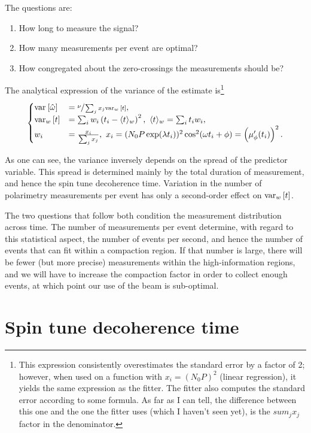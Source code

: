 \documentclass{article}
\begin{document}
The questions are:
\begin{enumerate}
	\item How long to measure the signal?
	\item How many measurements per event are optimal?
	\item How congregated about the zero-crossings the measurements should be?
\end{enumerate}

The analytical expression of the variance of the estimate is\footnote{This expression consistently overestimates the standard error by a factor of 2; however, when used on a function with $x_i = (N_0P)^2$ (linear regression), it yields the same expression as the fitter. The fitter also computes the standard error according to some formula. As far as I can tell, the difference between this one and the one the fitter uses (which I haven't seen yet), is the $sum_j x_j$ factor in the denominator.}
\begin{equation}
\begin{cases}
	\var{\hat\omega} &= \sfrac{\nu}{\sum_j x_j\var[w]{t}}, \\
	\var[w]{t} &= \sum_i w_i \bkt{t_i - \avg{t}_w}^2,~ \avg{t}_w = \sum_i t_i w_i, \\
	w_i &= \frac{x_i}{\sum_j x_j},~ x_i = (N_0P\exp(\lambda t_i))^2\cos^2(\omega t_i + \phi) = \bkt{\mupp}^2.
\end{cases}	
\end{equation}

As one can see, the variance inversely depends on the spread of the predictor variable. This spread is determined mainly by the total duration of measurement, and hence the spin tune decoherence time. Variation in the number of polarimetry measurements per event has only a second-order effect on $\var[w]{t}$.

The two questions that follow both condition the measurement distribution across time. The number of measurements per event determine, with regard to this statistical aspect, the number of events per second, and hence the number of events that can fit within a compaction region. If that number is large, there will be fewer (but more precise) measurements within the high-information regions, and we will have to increase the compaction factor in order to collect enough events, at which point our use of the beam is sub-optimal.


\section{Spin tune decoherence time}
\end{document}
